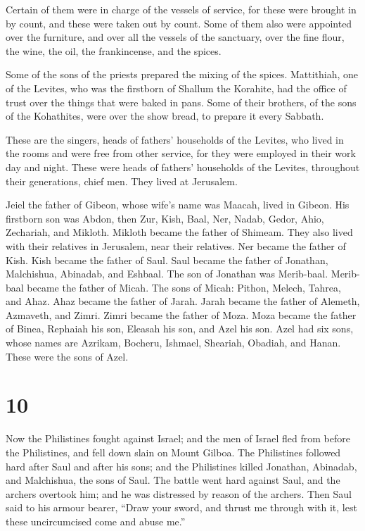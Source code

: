  Certain of them were in charge of the vessels of
service, for these were brought in by count, and these were taken out by
count.  Some of them also were appointed over the
furniture, and over all the vessels of the sanctuary, over the fine
flour, the wine, the oil, the frankincense, and the spices.

 Some of the sons of the priests prepared the mixing of
the spices.  Mattithiah, one of the Levites, who was the
firstborn of Shallum the Korahite, had the office of trust over the
things that were baked in pans.  Some of their brothers,
of the sons of the Kohathites, were over the show bread, to prepare it
every Sabbath.

 These are the singers, heads of fathers' households of
the Levites, who lived in the rooms and were free from other service,
for they were employed in their work day and night. 
These were heads of fathers' households of the Levites, throughout their
generations, chief men. They lived at Jerusalem.

 Jeiel the father of Gibeon, whose wife's name was
Maacah, lived in Gibeon.  His firstborn son was Abdon,
then Zur, Kish, Baal, Ner, Nadab,  Gedor, Ahio,
Zechariah, and Mikloth.  Mikloth became the father of
Shimeam. They also lived with their relatives in Jerusalem, near their
relatives.  Ner became the father of Kish. Kish became
the father of Saul. Saul became the father of Jonathan, Malchishua,
Abinadab, and Eshbaal.  The son of Jonathan was
Merib-baal. Merib-baal became the father of Micah.  The
sons of Micah: Pithon, Melech, Tahrea, and Ahaz.  Ahaz
became the father of Jarah. Jarah became the father of Alemeth,
Azmaveth, and Zimri. Zimri became the father of Moza. 
Moza became the father of Binea, Rephaiah his son, Eleasah his son, and
Azel his son.  Azel had six sons, whose names are
Azrikam, Bocheru, Ishmael, Sheariah, Obadiah, and Hanan. These were the
sons of Azel.

\hypertarget{section-9}{%
\section{10}\label{section-9}}

 Now the Philistines fought against Israel; and the men of
Israel fled from before the Philistines, and fell down slain on Mount
Gilboa.  The Philistines followed hard after Saul and
after his sons; and the Philistines killed Jonathan, Abinadab, and
Malchishua, the sons of Saul.  The battle went hard
against Saul, and the archers overtook him; and he was distressed by
reason of the archers.  Then Saul said to his armour
bearer, ``Draw your sword, and thrust me through with it, lest these
uncircumcised come and abuse me.''

